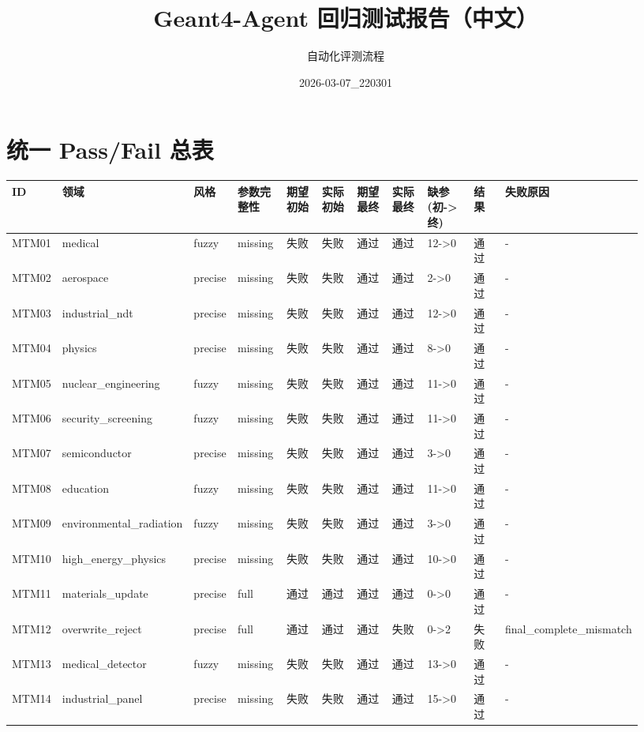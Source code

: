 \documentclass[11pt]{ctexart}
\title{Geant4-Agent 回归测试报告（中文）}
\author{自动化评测流程}
\date{2026-03-07\_220301}
\begin{document}
\maketitle
\section{统一 Pass/Fail 总表}
\begin{longtable}{p{0.06\linewidth}p{0.08\linewidth}p{0.07\linewidth}p{0.08\linewidth}p{0.07\linewidth}p{0.07\linewidth}p{0.07\linewidth}p{0.07\linewidth}p{0.09\linewidth}p{0.06\linewidth}p{0.21\linewidth}}
\toprule
ID & 领域 & 风格 & 参数完整性 & 期望初始 & 实际初始 & 期望最终 & 实际最终 & 缺参(初->终) & 结果 & 失败原因 \\
\midrule
MTM01 & medical & fuzzy & missing & 失败 & 失败 & 通过 & 通过 & 12->0 & 通过 & - \\
MTM02 & aerospace & precise & missing & 失败 & 失败 & 通过 & 通过 & 2->0 & 通过 & - \\
MTM03 & industrial\_ndt & precise & missing & 失败 & 失败 & 通过 & 通过 & 12->0 & 通过 & - \\
MTM04 & physics & precise & missing & 失败 & 失败 & 通过 & 通过 & 8->0 & 通过 & - \\
MTM05 & nuclear\_engineering & fuzzy & missing & 失败 & 失败 & 通过 & 通过 & 11->0 & 通过 & - \\
MTM06 & security\_screening & fuzzy & missing & 失败 & 失败 & 通过 & 通过 & 11->0 & 通过 & - \\
MTM07 & semiconductor & precise & missing & 失败 & 失败 & 通过 & 通过 & 3->0 & 通过 & - \\
MTM08 & education & fuzzy & missing & 失败 & 失败 & 通过 & 通过 & 11->0 & 通过 & - \\
MTM09 & environmental\_radiation & fuzzy & missing & 失败 & 失败 & 通过 & 通过 & 3->0 & 通过 & - \\
MTM10 & high\_energy\_physics & precise & missing & 失败 & 失败 & 通过 & 通过 & 10->0 & 通过 & - \\
MTM11 & materials\_update & precise & full & 通过 & 通过 & 通过 & 通过 & 0->0 & 通过 & - \\
MTM12 & overwrite\_reject & precise & full & 通过 & 通过 & 通过 & 失败 & 0->2 & 失败 & final\_complete\_mismatch \\
MTM13 & medical\_detector & fuzzy & missing & 失败 & 失败 & 通过 & 通过 & 13->0 & 通过 & - \\
MTM14 & industrial\_panel & precise & missing & 失败 & 失败 & 通过 & 通过 & 15->0 & 通过 & - \\

\end{longtable}
\end{document}
